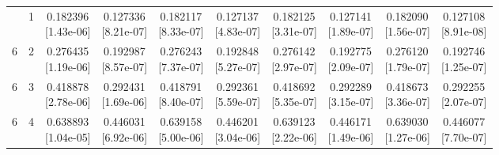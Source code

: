 \documentclass[12pt,letterpaper]{article}
\theoremstyle{plain}
\theoremstyle{definition}
\begin{document}
\begin{table}[p]
\begin{adjustbox}{max width=\linewidth}
\begin{tabular}{@{}rr*{8}{c}@{}}
\addlinespace[2pt]
6 & 1 & \shortstack{0.182396\\[-1pt]{\scriptsize[1.43e-06]}} & \shortstack{0.127336\\[-1pt]{\scriptsize[8.21e-07]}} & \shortstack{0.182117\\[-1pt]{\scriptsize[8.33e-07]}} & \shortstack{0.127137\\[-1pt]{\scriptsize[4.83e-07]}} & \shortstack{0.182125\\[-1pt]{\scriptsize[3.31e-07]}} & \shortstack{0.127141\\[-1pt]{\scriptsize[1.89e-07]}} & \shortstack{0.182090\\[-1pt]{\scriptsize[1.56e-07]}} & \shortstack{0.127108\\[-1pt]{\scriptsize[8.91e-08]}}\\
6 & 2 & \shortstack{0.276435\\[-1pt]{\scriptsize[1.19e-06]}} & \shortstack{0.192987\\[-1pt]{\scriptsize[8.57e-07]}} & \shortstack{0.276243\\[-1pt]{\scriptsize[7.37e-07]}} & \shortstack{0.192848\\[-1pt]{\scriptsize[5.27e-07]}} & \shortstack{0.276142\\[-1pt]{\scriptsize[2.97e-07]}} & \shortstack{0.192775\\[-1pt]{\scriptsize[2.09e-07]}} & \shortstack{0.276120\\[-1pt]{\scriptsize[1.79e-07]}} & \shortstack{0.192746\\[-1pt]{\scriptsize[1.25e-07]}}\\
6 & 3 & \shortstack{0.418878\\[-1pt]{\scriptsize[2.78e-06]}} & \shortstack{0.292431\\[-1pt]{\scriptsize[1.69e-06]}} & \shortstack{0.418791\\[-1pt]{\scriptsize[8.40e-07]}} & \shortstack{0.292361\\[-1pt]{\scriptsize[5.59e-07]}} & \shortstack{0.418692\\[-1pt]{\scriptsize[5.35e-07]}} & \shortstack{0.292289\\[-1pt]{\scriptsize[3.15e-07]}} & \shortstack{0.418673\\[-1pt]{\scriptsize[3.36e-07]}} & \shortstack{0.292255\\[-1pt]{\scriptsize[2.07e-07]}}\\
6 & 4 & \shortstack{0.638893\\[-1pt]{\scriptsize[1.04e-05]}} & \shortstack{0.446031\\[-1pt]{\scriptsize[6.92e-06]}} & \shortstack{0.639158\\[-1pt]{\scriptsize[5.00e-06]}} & \shortstack{0.446201\\[-1pt]{\scriptsize[3.04e-06]}} & \shortstack{0.639123\\[-1pt]{\scriptsize[2.22e-06]}} & \shortstack{0.446171\\[-1pt]{\scriptsize[1.49e-06]}} & \shortstack{0.639030\\[-1pt]{\scriptsize[1.27e-06]}} & \shortstack{0.446077\\[-1pt]{\scriptsize[7.70e-07]}}\\

\end{tabular}
\end{adjustbox}
\end{table}
\end{document}
